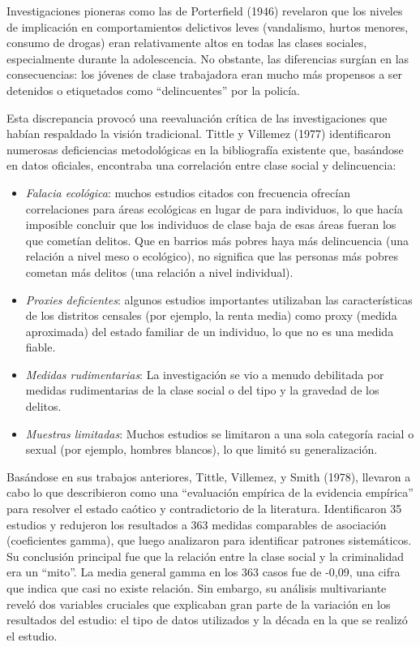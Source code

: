 \documentclass[
  spanish,
  letterpaper,
  DIV=11,
  numbers=noendperiod]{scrreprt}
\begin{document}
Investigaciones pioneras como las de Porterfield (1946) revelaron que
los niveles de implicación en comportamientos delictivos leves
(vandalismo, hurtos menores, consumo de drogas) eran relativamente altos
en todas las clases sociales, especialmente durante la adolescencia. No
obstante, las diferencias surgían en las consecuencias: los jóvenes de
clase trabajadora eran mucho más propensos a ser detenidos o etiquetados
como ``delincuentes'' por la policía.

Esta discrepancia provocó una reevaluación crítica de las
investigaciones que habían respaldado la visión tradicional. Tittle y
Villemez (1977) identificaron numerosas deficiencias metodológicas en la
bibliografía existente que, basándose en datos oficiales, encontraba una
correlación entre clase social y delincuencia:

\begin{itemize}
\item
  \emph{Falacia ecológica}: muchos estudios citados con frecuencia
  ofrecían correlaciones para áreas ecológicas en lugar de para
  individuos, lo que hacía imposible concluir que los individuos de
  clase baja de esas áreas fueran los que cometían delitos. Que en
  barrios más pobres haya más delincuencia (una relación a nivel meso o
  ecológico), no significa que las personas más pobres cometan más
  delitos (una relación a nivel individual).
\item
  \emph{Proxies deficientes}: algunos estudios importantes utilizaban
  las características de los distritos censales (por ejemplo, la renta
  media) como proxy (medida aproximada) del estado familiar de un
  individuo, lo que no es una medida fiable.
\item
  \emph{Medidas rudimentarias}: La investigación se vio a menudo
  debilitada por medidas rudimentarias de la clase social o del tipo y
  la gravedad de los delitos.
\item
  \emph{Muestras limitadas}: Muchos estudios se limitaron a una sola
  categoría racial o sexual (por ejemplo, hombres blancos), lo que
  limitó su generalización.
\end{itemize}

Basándose en sus trabajos anteriores, Tittle, Villemez, y Smith (1978),
llevaron a cabo lo que describieron como una ``evaluación empírica de la
evidencia empírica'' para resolver el estado caótico y contradictorio de
la literatura. Identificaron 35 estudios y redujeron los resultados a
363 medidas comparables de asociación (coeficientes gamma), que luego
analizaron para identificar patrones sistemáticos. Su conclusión
principal fue que la relación entre la clase social y la criminalidad
era un ``mito''. La media general gamma en los 363 casos fue de -0,09,
una cifra que indica que casi no existe relación. Sin embargo, su
análisis multivariante reveló dos variables cruciales que explicaban
gran parte de la variación en los resultados del estudio: el tipo de
datos utilizados y la década en la que se realizó el estudio.
\end{document}

